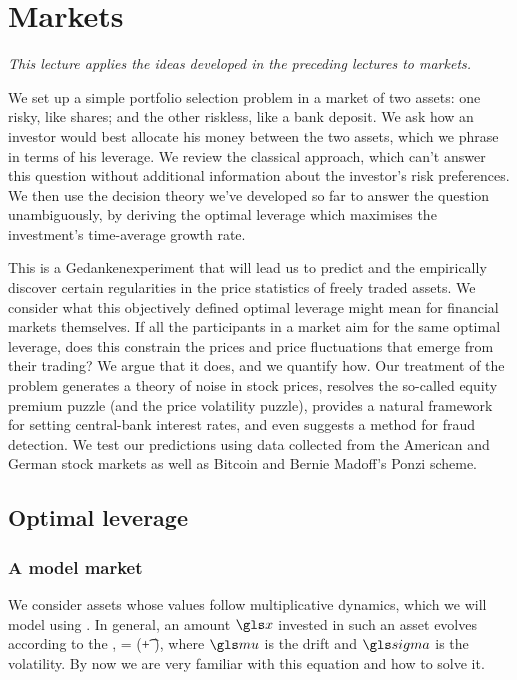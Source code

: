 
\chapter{Markets}

{\it This lecture applies the ideas developed in the preceding lectures to markets. 

We set up a simple portfolio selection problem in a market of two assets: one risky, like shares; and the other riskless, like a bank deposit. We ask how an investor would best allocate his money between the two assets, which we phrase in terms of his leverage. We review the classical approach, which can't answer this question without additional information about the investor's risk preferences. We then use the decision theory we've developed so far to answer the question unambiguously, by deriving the optimal leverage which maximises the investment's time-average growth rate. 

This is a Gedankenexperiment that will lead us to predict and the empirically discover certain regularities in the price statistics of freely traded assets. We consider what this objectively defined optimal leverage might mean for financial markets themselves. If all the participants in a market aim for the same optimal leverage, does this constrain the prices and price fluctuations that emerge from their trading? We argue that it does, and we quantify how. Our treatment of the problem generates a theory of noise in stock prices, resolves the so-called equity premium puzzle (and the price volatility puzzle), provides a natural framework for setting central-bank interest rates, and even suggests a method for fraud detection.
We test our predictions using data collected from the American and German stock markets as well as Bitcoin and Bernie Madoff's Ponzi scheme.
}

\newpage


\section{Optimal leverage}

\subsection{A model market}
We consider assets whose values follow multiplicative dynamics, which we will model using \GBM. In general, an amount $\x$ invested in such an asset evolves according to the \SDE,
\be
\gd\x = \x(\gmu \gd\t + \gsigma \gd\gW),
\ee
where $\gmu$ is the drift and $\gsigma$ is the volatility. By now we are very familiar with this equation and how to solve it.

